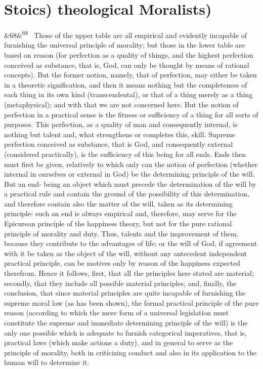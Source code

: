 \documentclass[12pt]{article}
\newcommand{\para}[1][]{\par\noindent\ifx&#1&\else\textsuperscript{\footnotesize #1}~\fi}
\begin{document}
\section*{Stoics) theological Moralists)}

\para[68] Those of the upper table are all empirical and evidently incapable of furnishing the universal principle of morality; but those in the lower table are based on reason (for perfection as a quality of things, and the highest perfection conceived as substance, that is, God, can only be thought by means of rational concepts). But the former notion, namely, that of perfection, may either be taken in a theoretic signification, and then it means nothing but the completeness of each thing in its own kind (transcendental), or that of a thing merely as a thing (metaphysical); and with that we are not concerned here. But the notion of perfection in a practical sense is the fitness or sufficiency of a thing for all sorts of purposes. This perfection, as a quality of man and consequently internal, is nothing but talent and, what strengthens or completes this, skill. Supreme perfection conceived as substance, that is God, and consequently external (considered practically), is the sufficiency of this being for all ends. Ends then must first be given, relatively to which only can the notion of perfection (whether internal in ourselves or external in God) be the determining principle of the will. But an end- being an object which must precede the determination of the will by a practical rule and contain the ground of the possibility of this determination, and therefore contain also the matter of the will, taken as its determining principle- such an end is always empirical and, therefore, may serve for the Epicurean principle of the happiness theory, but not for the pure rational principle of morality and duty. Thus, talents and the improvement of them, because they contribute to the advantages of life; or the will of God, if agreement with it be taken as the object of the will, without any antecedent independent practical principle, can be motives only by reason of the happiness expected therefrom. Hence it follows, first, that all the principles here stated are material; secondly, that they include all possible material principles; and, finally, the conclusion, that since material principles are quite incapable of furnishing the supreme moral law (as has been shown), the formal practical principle of the pure reason (according to which the mere form of a universal legislation must constitute the supreme and immediate determining principle of the will) is the only one possible which is adequate to furnish categorical imperatives, that is, practical laws (which make actions a duty), and in general to serve as the principle of morality, both in criticizing conduct and also in its application to the human will to determine it.
\end{document}
